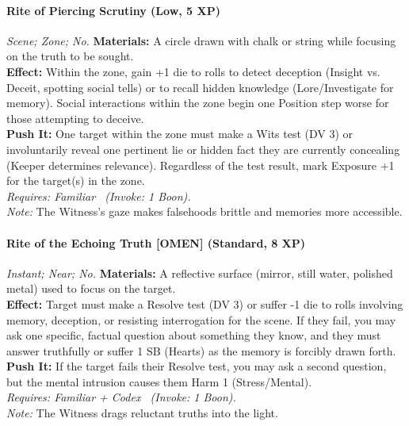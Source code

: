 \paragraph{Rite of Piercing Scrutiny (Low, 5 XP)} \emph{Scene; Zone; No.}
\textbf{Materials:} A circle drawn with chalk or string while focusing on the truth to be sought. \\
\textbf{Effect:} Within the zone, gain +1 die to rolls to detect deception (Insight vs. Deceit, spotting social tells) or to recall hidden knowledge (Lore/Investigate for memory). Social interactions within the zone begin one Position step worse for those attempting to deceive. \\
\textbf{Push It:} One target within the zone must make a Wits test (DV 3) or involuntarily reveal one pertinent lie or hidden fact they are currently concealing (Keeper determines relevance). Regardless of the test result, mark Exposure +1 for the target(s) in the zone. \\
\emph{Requires: Familiar \ (\textit{Invoke:} 1 Boon).} \\
\emph{Note:} The Witness's gaze makes falsehoods brittle and memories more accessible. %

\paragraph{Rite of the Echoing Truth [OMEN] (Standard, 8 XP)} \emph{Instant; Near; No.}
\textbf{Materials:} A reflective surface (mirror, still water, polished metal) used to focus on the target. \\
\textbf{Effect:} Target must make a Resolve test (DV 3) or suffer -1 die to rolls involving memory, deception, or resisting interrogation for the scene. If they fail, you may ask one specific, factual question about something they know, and they must answer truthfully or suffer 1 SB (Hearts) as the memory is forcibly drawn forth. \\
\textbf{Push It:} If the target fails their Resolve test, you may ask a second question, but the mental intrusion causes them Harm 1 (Stress/Mental). \\
\emph{Requires: Familiar + Codex \ (\textit{Invoke:} 1 Boon).} \\
\emph{Note:} The Witness drags reluctant truths into the light. %

